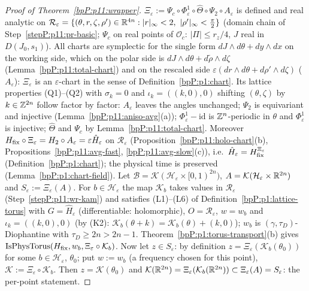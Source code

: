 \begin{proof}[Proof of Theorem~\ref{bpP:p11:wrapper}]
\label{stepP:p11:wr-chain} $\Xi_\varepsilon:=\Psi_c\circ\Phi^1_\varepsilon\circ\hat\Theta\circ\Psi_2\circ A_\varepsilon$ is defined and real analytic on $\mathcal R_\varepsilon=\{(\theta,r,\zeta,\rho')\in\mathbb{R}^{4n}:\lvert r\rvert_\infty<2,\ \lvert\rho'\rvert_\infty<\frac\pi2\}$ (domain chain of Step~\ref{stepP:p11:pr-basic}; $\Psi_c$ on real points of $\mathcal O_c$: $\lvert\Pi\rvert\le r_z/4$, $J$ real in $D(J_0,s_1)$). All charts are symplectic for the single form $dJ\wedge d\theta+dy\wedge dx$ on the working side, which on the polar side is $dJ\wedge d\theta+d\tilde\rho\wedge d\zeta$ (Lemma~\ref{bpP:p11:total-chart}) and on the rescaled side $\varepsilon(dr\wedge d\theta+d\rho'\wedge d\zeta)$ ($A_\varepsilon$): $\Xi_\varepsilon$ is an $\varepsilon$-chart in the sense of Definition~\ref{bpP:p1:chart}. Its lattice properties (Q1)--(Q2) with $\sigma_k=0$ and $\iota_k=((k,0),0)$ shifting $(\theta,\zeta)$ by $k\in\mathbb{Z}^{2n}$ follow factor by factor: $A_\varepsilon$ leaves the angles unchanged; $\Psi_2$ is equivariant and injective (Lemma~\ref{bpP:p11:aniso-avg}(a)); $\Phi^1_\varepsilon-\mathrm{id}$ is $\mathbb{Z}^n$-periodic in $\theta$ and $\Phi^1_\varepsilon$ is injective; $\hat\Theta$ and $\Psi_c$ by Lemma~\ref{bpP:p11:total-chart}. Moreover $H_{\rm fix}\circ\Xi_\varepsilon=H_2\circ A_\varepsilon=\varepsilon\hat H_\varepsilon$ on $\mathcal R_\varepsilon$ (Proposition~\ref{bpP:p11:holo-chart}(b), Propositions~\ref{bpP:p11:avg-fast}, \ref{bpP:p11:avg-slow}(c)), i.e.\ $\hat H_\varepsilon=H_{\rm fix}^{\Xi_\varepsilon}$ (Definition~\ref{bpP:p1:chart}); the physical time is preserved (Lemma~\ref{bpP:p1:chart-field}).
\label{stepP:p11:wr-tor} Let $\mathcal B=\mathcal K(\mathcal H_\varepsilon\times[0,1)^{2n})$, $A=\mathcal K(\mathcal H_\varepsilon\times\mathbb{R}^{2n})$ and $S_\varepsilon:=\Xi_\varepsilon(A)$. For $b\in\mathcal H_\varepsilon$ the map $\mathcal K_b$ takes values in $\mathcal R_\varepsilon$ (Step~\ref{stepP:p11:wr-kam}) and satisfies (L1)--(L6) of Definition~\ref{bpP:p1:lattice-torus} with $G=\hat H_\varepsilon$ (differentiable: holomorphic), $O=\mathcal R_\varepsilon$, $w=w_b$ and $\iota_k=((k,0),0)$ (by (K2): $\mathcal K_b(\theta+k)=\mathcal K_b(\theta)+(k,0)$); $w_b$ is $(\gamma,\tau_D)$-Diophantine with $\tau_D\ge2n>2n-1$. Theorem~\ref{bpP:p1:torus-transport}(b) gives $\operatorname{IsPhysTorus}(H_{\rm fix},w_b,\Xi_\varepsilon\circ\mathcal K_b)$. Now let $z\in S_\varepsilon$: by definition $z=\Xi_\varepsilon(\mathcal K_b(\theta_0))$ for some $b\in\mathcal H_\varepsilon$, $\theta_0$; put $w:=w_b$ (a frequency chosen for this point), $\mathcal K:=\Xi_\varepsilon\circ\mathcal K_b$. Then $z=\mathcal K(\theta_0)$ and $\mathcal K(\mathbb{R}^{2n})=\Xi_\varepsilon(\mathcal K_b(\mathbb{R}^{2n}))\subset\Xi_\varepsilon(A)=S_\varepsilon$: the per-point statement.

\end{proof}
